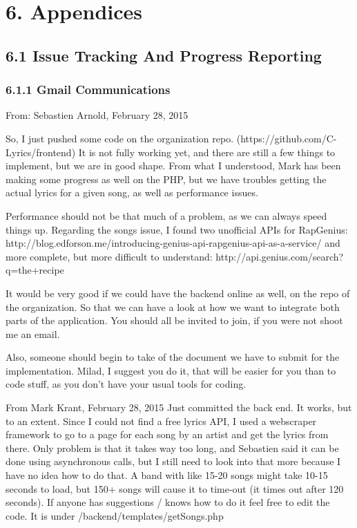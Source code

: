 \documentclass[]{article}
\begin{document}
\section{6. Appendices}\label{appendices}

\subsection{6.1 Issue Tracking And Progress
Reporting}\label{issue-tracking-and-progress-reporting}

\subsubsection{6.1.1 Gmail Communications}\label{gmail-communications}

From: Sebastien Arnold, February 28, 2015

So, I just pushed some code on the organization repo.
(https://github.com/C-Lyrics/frontend) It is not fully working yet, and
there are still a few things to implement, but we are in good shape.
From what I understood, Mark has been making some progress as well on
the PHP, but we have troubles getting the actual lyrics for a given
song, as well as performance issues.

Performance should not be that much of a problem, as we can always speed
things up. Regarding the songs issue, I found two unofficial APIs for
RapGenius:
http://blog.edforson.me/introducing-genius-api-rapgenius-api-as-a-service/
and more complete, but more difficult to understand:
http://api.genius.com/search?q=the+recipe

It would be very good if we could have the backend online as well, on
the repo of the organization. So that we can have a look at how we want
to integrate both parts of the application. You should all be invited to
join, if you were not shoot me an email.

Also, someone should begin to take of the document we have to submit for
the implementation. Milad, I suggest you do it, that will be easier for
you than to code stuff, as you don't have your usual tools for coding.

From Mark Krant, February 28, 2015 Just committed the back end. It
works, but to an extent. Since I could not find a free lyrics API, I
used a webscraper framework to go to a page for each song by an artist
and get the lyrics from there. Only problem is that it takes way too
long, and Sebastien said it can be done using asynchronous calls, but I
still need to look into that more because I have no idea how to do that.
A band with like 15-20 songs might take 10-15 seconds to load, but 150+
songs will cause it to time-out (it times out after 120 seconds). If
anyone has suggestions / knows how to do it feel free to edit the code.
It is under /backend/templates/getSongs.php
\end{document}
